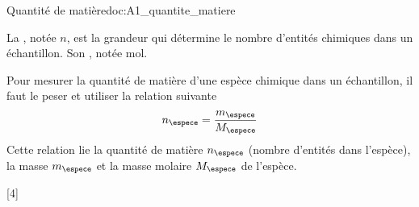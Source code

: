 \begin{doc}{Quantité de matière}{doc:A1_quantite_matiere}
  \begin{importants}
    La , notée $n$, est la grandeur qui détermine le nombre d'entités chimiques dans un échantillon.
    Son , notée \unit{\mole}.
  \end{importants}

  Pour mesurer la quantité de matière d'une espèce chimique dans un échantillon,
  il faut le peser et utiliser la relation suivante
  \begin{equation*}
    n_\espece = \dfrac{m_\espece}{M_\espece}
  \end{equation*}
  Cette relation lie la quantité de matière $n_\espece$ (nombre d'entités dans l'espèce), la masse $m_\espece$ et la masse molaire $M_\espece$ de l'espèce.
\end{doc}

[4]
